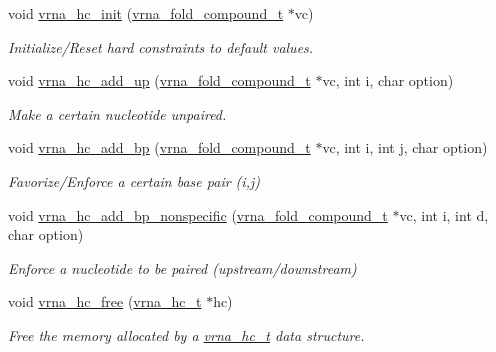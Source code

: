 \begin{DoxyCompactItemize}
\item 
void \hyperlink{group__hard__constraints_ga36ff456c43bf920629cee5a236e4f0ff}{vrna\-\_\-hc\-\_\-init} (\hyperlink{group__fold__compound_ga1b0cef17fd40466cef5968eaeeff6166}{vrna\-\_\-fold\-\_\-compound\-\_\-t} $\ast$vc)
\begin{DoxyCompactList}\small\item\em Initialize/\-Reset hard constraints to default values. \end{DoxyCompactList}\item 
void \hyperlink{group__hard__constraints_gaeb352e3e6ccd2b567bafa451365bb545}{vrna\-\_\-hc\-\_\-add\-\_\-up} (\hyperlink{group__fold__compound_ga1b0cef17fd40466cef5968eaeeff6166}{vrna\-\_\-fold\-\_\-compound\-\_\-t} $\ast$vc, int i, char option)
\begin{DoxyCompactList}\small\item\em Make a certain nucleotide unpaired. \end{DoxyCompactList}\item 
void \hyperlink{group__hard__constraints_gac49305fc5c7d8653c5fbd2de1e1615e2}{vrna\-\_\-hc\-\_\-add\-\_\-bp} (\hyperlink{group__fold__compound_ga1b0cef17fd40466cef5968eaeeff6166}{vrna\-\_\-fold\-\_\-compound\-\_\-t} $\ast$vc, int i, int j, char option)
\begin{DoxyCompactList}\small\item\em Favorize/\-Enforce a certain base pair (i,j) \end{DoxyCompactList}\item 
void \hyperlink{group__hard__constraints_gadeb1083d0dc928e1e931065aae54ad82}{vrna\-\_\-hc\-\_\-add\-\_\-bp\-\_\-nonspecific} (\hyperlink{group__fold__compound_ga1b0cef17fd40466cef5968eaeeff6166}{vrna\-\_\-fold\-\_\-compound\-\_\-t} $\ast$vc, int i, int d, char option)
\begin{DoxyCompactList}\small\item\em Enforce a nucleotide to be paired (upstream/downstream) \end{DoxyCompactList}\item 
void \hyperlink{group__hard__constraints_ga696dcf77887d856c6f21ea266d8b9ca2}{vrna\-\_\-hc\-\_\-free} (\hyperlink{group__constraints_gac7e4c4f8abe3163a68110c5bff24e01d}{vrna\-\_\-hc\-\_\-t} $\ast$hc)
\begin{DoxyCompactList}\small\item\em Free the memory allocated by a \hyperlink{group__constraints_gac7e4c4f8abe3163a68110c5bff24e01d}{vrna\-\_\-hc\-\_\-t} data structure. \end{DoxyCompactList}\end{DoxyCompactItemize}


